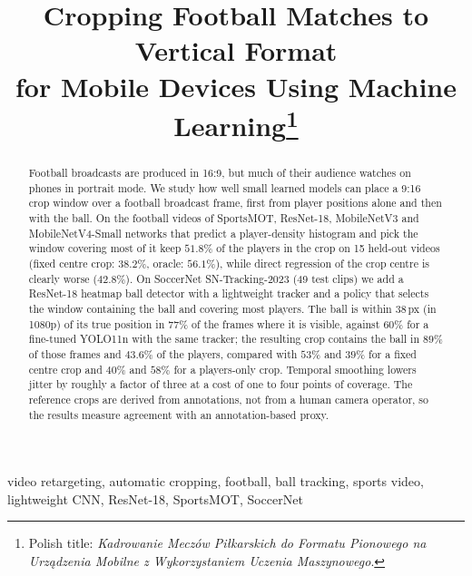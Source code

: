 \documentclass[conference]{IEEEtran}
\begin{document}
\title{Cropping Football Matches to Vertical Format\\for Mobile Devices Using Machine Learning\thanks{Polish title: \emph{Kadrowanie Mecz\'ow Pi\l{}karskich do Formatu Pionowego na Urz\k{a}dzenia Mobilne z Wykorzystaniem Uczenia Maszynowego}.}}

\author{
}

\maketitle

\begin{abstract}
Football broadcasts are produced in 16:9, but much of their audience watches on phones in portrait mode. We study how well small learned models can place a 9:16 crop window over a football broadcast frame, first from player positions alone and then with the ball. On the football videos of SportsMOT, ResNet-18, MobileNetV3 and MobileNetV4-Small networks that predict a player-density histogram and pick the window covering most of it keep $51.8\%$ of the players in the crop on 15 held-out videos (fixed centre crop: $38.2\%$, oracle: $56.1\%$), while direct regression of the crop centre is clearly worse ($42.8\%$). On SoccerNet SN-Tracking-2023 (49 test clips) we add a ResNet-18 heatmap ball detector with a lightweight tracker and a policy that selects the window containing the ball and covering most players. The ball is within $38$\,px (in 1080p) of its true position in $77\%$ of the frames where it is visible, against $60\%$ for a fine-tuned YOLO11n with the same tracker; the resulting crop contains the ball in $89\%$ of those frames and $43.6\%$ of the players, compared with $53\%$ and $39\%$ for a fixed centre crop and $40\%$ and $58\%$ for a players-only crop. Temporal smoothing lowers jitter by roughly a factor of three at a cost of one to four points of coverage. The reference crops are derived from annotations, not from a human camera operator, so the results measure agreement with an annotation-based proxy.
\end{abstract}

\begin{IEEEkeywords}
video retargeting, automatic cropping, football, ball tracking, sports video, lightweight CNN, ResNet-18, SportsMOT, SoccerNet
\end{IEEEkeywords}
\end{document}
